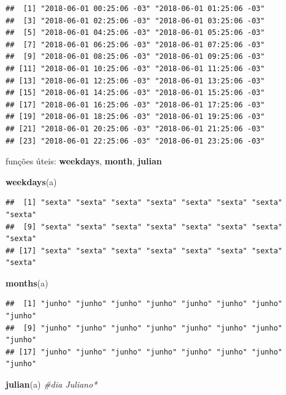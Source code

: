 \documentclass[]{book}
\newenvironment{Shaded}{\begin{snugshade}}{\end{snugshade}}
\newcommand{\KeywordTok}[1]{\textcolor[rgb]{0.13,0.29,0.53}{\textbf{#1}}}
\newcommand{\CommentTok}[1]{\textcolor[rgb]{0.56,0.35,0.01}{\textit{#1}}}
\newcommand{\NormalTok}[1]{#1}
\theoremstyle{definition}
\theoremstyle{definition}
\theoremstyle{definition}
\theoremstyle{remark}
\begin{document}
\begin{verbatim}
##  [1] "2018-06-01 00:25:06 -03" "2018-06-01 01:25:06 -03"
##  [3] "2018-06-01 02:25:06 -03" "2018-06-01 03:25:06 -03"
##  [5] "2018-06-01 04:25:06 -03" "2018-06-01 05:25:06 -03"
##  [7] "2018-06-01 06:25:06 -03" "2018-06-01 07:25:06 -03"
##  [9] "2018-06-01 08:25:06 -03" "2018-06-01 09:25:06 -03"
## [11] "2018-06-01 10:25:06 -03" "2018-06-01 11:25:06 -03"
## [13] "2018-06-01 12:25:06 -03" "2018-06-01 13:25:06 -03"
## [15] "2018-06-01 14:25:06 -03" "2018-06-01 15:25:06 -03"
## [17] "2018-06-01 16:25:06 -03" "2018-06-01 17:25:06 -03"
## [19] "2018-06-01 18:25:06 -03" "2018-06-01 19:25:06 -03"
## [21] "2018-06-01 20:25:06 -03" "2018-06-01 21:25:06 -03"
## [23] "2018-06-01 22:25:06 -03" "2018-06-01 23:25:06 -03"
\end{verbatim}

funções úteis: \textbf{weekdays}, \textbf{month}, \textbf{julian}

\begin{Shaded}
\begin{Highlighting}[]
\KeywordTok{weekdays}\NormalTok{(a)}
\end{Highlighting}
\end{Shaded}

\begin{verbatim}
##  [1] "sexta" "sexta" "sexta" "sexta" "sexta" "sexta" "sexta" "sexta"
##  [9] "sexta" "sexta" "sexta" "sexta" "sexta" "sexta" "sexta" "sexta"
## [17] "sexta" "sexta" "sexta" "sexta" "sexta" "sexta" "sexta" "sexta"
\end{verbatim}

\begin{Shaded}
\begin{Highlighting}[]
\KeywordTok{months}\NormalTok{(a)}
\end{Highlighting}
\end{Shaded}

\begin{verbatim}
##  [1] "junho" "junho" "junho" "junho" "junho" "junho" "junho" "junho"
##  [9] "junho" "junho" "junho" "junho" "junho" "junho" "junho" "junho"
## [17] "junho" "junho" "junho" "junho" "junho" "junho" "junho" "junho"
\end{verbatim}

\begin{Shaded}
\begin{Highlighting}[]
\KeywordTok{julian}\NormalTok{(a) }\CommentTok{#dia Juliano*}
\end{Highlighting}
\end{Shaded}
\end{document}
